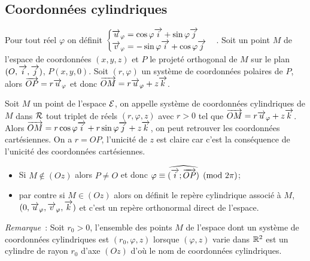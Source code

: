 \subsection{Coordonnées cylindriques}
\label{subsec:coordcyl}
Pour tout réel $\varphi$ on définit $\begin{cases}\overrightarrow{u}_\varphi=\cos\varphi\overrightarrow{i}+\sin\varphi\overrightarrow{j}\\ \overrightarrow{v}_\varphi=-\sin\varphi\overrightarrow{i}+\cos\varphi\overrightarrow{j}\end{cases}$. Soit un point $M$ de l'espace de coordonnées $(x,y,z)$ et $P$ le projeté orthogonal de $M$ sur le plan $(O,\overrightarrow{i},\overrightarrow{j})$, $P(x,y,0)$. Soit $(r,\varphi)$ un système de coordonnées polaires de $P$, alors $\overrightarrow{OP}=r\overrightarrow{u}_\varphi$ et donc $\overrightarrow{OM}=r\overrightarrow{u}_\varphi+z\overrightarrow{k}$.
\begin{defdef}
  Soit $M$ un point de l'espace $\mathcal{E}$, on appelle système de coordonnées cylindriques de $M$ dans $\mathcal{R}$ tout triplet de réels $(r,\varphi,z)$ avec $r>0$ tel que $\overrightarrow{OM}=r\overrightarrow{u}_\varphi+z\overrightarrow{k}$. Alors $\overrightarrow{OM}=r\cos\varphi\overrightarrow{i}+r\sin\varphi\overrightarrow{j}+z\overrightarrow{k}$, on peut retrouver les coordonnées cartésiennes. On a $r=OP$, l'unicité de $z$ est claire car c'est la conséquence de l'unicité des coordonnées cartésiennes. 
\begin{itemize}
\item Si $M\notin(Oz)$ alors $P\neq O$ et donc $\varphi \equiv \widehat{(\overrightarrow{i};\overrightarrow{OP})} \pmod {2\pi}$;
\item par contre si $M\in(Oz)$ alors on définit le repère cylindrique associé à $M$, $(0,\overrightarrow{u}_\varphi,\overrightarrow{v}_\varphi,\overrightarrow{k})$ et c'est un repère orthonormal direct de l'espace.
\end{itemize}
\end{defdef}

\emph{Remarque}~: Soit $r_0>0$, l'ensemble des points $M$ de l'espace dont un système de coordonnées cylindriques est $(r_0,\varphi,z)$ lorsque $(\varphi,z)$ varie dans $\mathbb{R}^2$ est un cylindre de rayon $r_0$ d'axe $(Oz)$ d'où le nom de coordonnées cylindriques.


